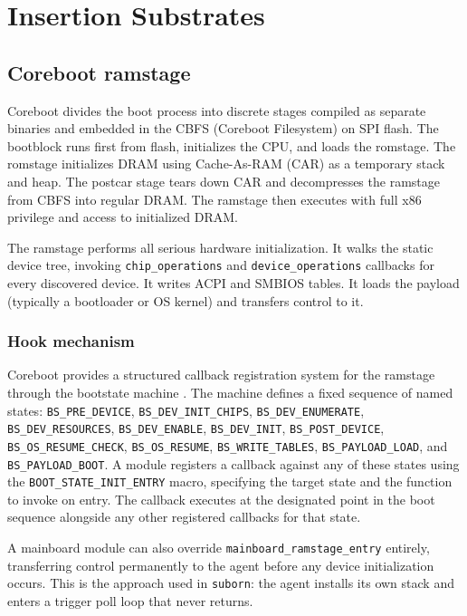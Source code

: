 \documentclass[11pt,a4paper]{article}
\begin{document}
\section{Insertion Substrates}

\subsection{Coreboot ramstage}

Coreboot divides the boot process into discrete stages compiled as separate binaries and embedded in the CBFS (Coreboot Filesystem) on SPI flash. The bootblock runs first from flash, initializes the CPU, and loads the romstage. The romstage initializes DRAM using Cache-As-RAM (CAR) as a temporary stack and heap. The postcar stage tears down CAR and decompresses the ramstage from CBFS into regular DRAM. The ramstage then executes with full x86 privilege and access to initialized DRAM.

The ramstage performs all serious hardware initialization. It walks the static device tree, invoking \texttt{chip\_operations} and \texttt{device\_operations} callbacks for every discovered device. It writes ACPI and SMBIOS tables. It loads the payload (typically a bootloader or OS kernel) and transfers control to it.

\subsubsection{Hook mechanism}

Coreboot provides a structured callback registration system for the ramstage through the bootstate machine \cite{coreboot-bootstate}. The machine defines a fixed sequence of named states: \texttt{BS\_PRE\_DEVICE}, \texttt{BS\_DEV\_INIT\_CHIPS}, \texttt{BS\_DEV\_ENUMERATE}, \texttt{BS\_DEV\_RESOURCES}, \texttt{BS\_DEV\_ENABLE}, \texttt{BS\_DEV\_INIT}, \texttt{BS\_POST\_DEVICE}, \texttt{BS\_OS\_RESUME\_CHECK}, \texttt{BS\_OS\_RESUME}, \texttt{BS\_WRITE\_TABLES}, \texttt{BS\_PAYLOAD\_LOAD}, and \texttt{BS\_PAYLOAD\_BOOT}. A module registers a callback against any of these states using the \texttt{BOOT\_STATE\_INIT\_ENTRY} macro, specifying the target state and the function to invoke on entry. The callback executes at the designated point in the boot sequence alongside any other registered callbacks for that state.

A mainboard module can also override \texttt{mainboard\_ramstage\_entry} entirely, transferring control permanently to the agent before any device initialization occurs. This is the approach used in \texttt{suborn}: the agent installs its own stack and enters a trigger poll loop that never returns.
\end{document}
